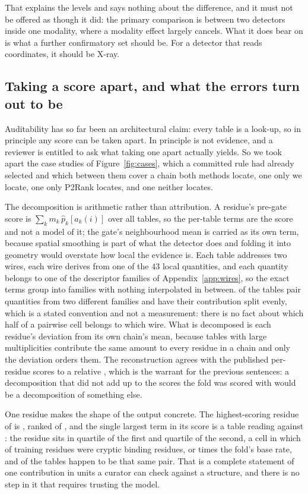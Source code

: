 \documentclass[11pt]{article}
\begin{document}
That explains the levels and says nothing about the difference, and it must not be
offered as though it did: the primary comparison is between two detectors inside
one modality, where a modality effect largely cancels. What it does bear on is
what a further confirmatory set should be. For a detector that reads coordinates,
it should be X-ray.

\subsection{Taking a score apart, and what the errors turn out to be}
\label{sec:audit}
Auditability has so far been an architectural claim: every table is a look-up, so
in principle any score can be taken apart. In principle is not evidence, and a
reviewer is entitled to ask what taking one apart actually yields. So we took
apart the \AudCases{} case studies of Figure~\ref{fig:cases}, which a committed
rule had already selected and which between them cover a chain both methods
locate, one only we locate, one only P2Rank locates, and one neither locates.

The decomposition is arithmetic rather than attribution. A residue's pre-gate
score is $\sum_k m_k \, \hat p_k[a_k(i)]$ over all \NTabTables{} tables, so the
per-table terms are the score and not a model of it; the gate's neighbourhood
mean is carried as its own term, because spatial smoothing is part of what the
detector does and folding it into geometry would overstate how local the evidence
is. Each table addresses two wires, each wire derives from one of the \(43\)
local quantities, and each quantity belongs to one of the descriptor families of
Appendix~\ref{app:wires}, so the exact terms group into families with nothing
interpolated in between. \AudTablesMixed{} of the \NTabTables{} tables pair quantities
from two different families and have their contribution split evenly, which is a
stated convention and not a measurement: there is no fact about which half of a
pairwise cell belongs to which wire. What is decomposed is each residue's
deviation from its own chain's mean, because tables with large multiplicities
contribute the same amount to every residue in a chain and only the deviation
orders them. The reconstruction agrees with the published per-residue scores to a
relative \AudReproErr{}, which is the warrant for the previous sentences: a
decomposition that did not add up to the scores the fold was scored with would be
a decomposition of something else.

One residue makes the shape of the output concrete. The highest-scoring residue
of \AudEgUnit{} is \AudEgRes{}, ranked \AudEgRank{} of \AudEgOf{}, and the single
largest term in its score is a table reading \AudEgQA{} against \AudEgQB{}: the
residue sits in quartile \AudEgLevA{} of the first and quartile \AudEgLevB{} of
the second, a cell in which \AudEgRate{} of training residues were cryptic
binding residues, or \AudEgTimesBase{} times the fold's base rate, and
\AudEgMult{} of the \NTabTables{} tables happen to be that same pair. That is a
complete statement of one contribution in units a curator can check against a
structure, and there is no step in it that requires trusting the model.
\end{document}
